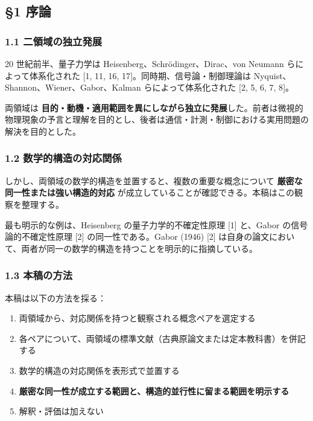 \documentclass[
]{ltjsarticle}
\providecommand{\tightlist}{%
  \setlength{\itemsep}{0pt}\setlength{\parskip}{0pt}}
\begin{document}
\subsection{§1 序論}\label{ux5e8fux8ad6}

\subsubsection{1.1
二領域の独立発展}\label{ux4e8cux9818ux57dfux306eux72ecux7acbux767aux5c55}

20 世紀前半、量子力学は Heisenberg、Schrödinger、Dirac、von Neumann
らによって体系化された {[}1, 11, 16, 17{]}。同時期、信号論・制御理論は
Nyquist、Shannon、Wiener、Gabor、Kalman らによって体系化された {[}2, 5,
6, 7, 8{]}。

両領域は
\textbf{目的・動機・適用範囲を異にしながら独立に発展}した。前者は微視的物理現象の予言と理解を目的とし、後者は通信・計測・制御における実用問題の解決を目的とした。

\subsubsection{1.2
数学的構造の対応関係}\label{ux6570ux5b66ux7684ux69cbux9020ux306eux5bfeux5fdcux95a2ux4fc2}

しかし、両領域の数学的構造を並置すると、複数の重要な概念について
\textbf{厳密な同一性または強い構造的対応}
が成立していることが確認できる。本稿はこの観察を整理する。

最も明示的な例は、Heisenberg の量子力学的不確定性原理 {[}1{]} と、Gabor
の信号論的不確定性原理 {[}2{]} の同一性である。Gabor (1946) {[}2{]}
は自身の論文において、両者が同一の数学的構造を持つことを明示的に指摘している。

\subsubsection{1.3 本稿の方法}\label{ux672cux7a3fux306eux65b9ux6cd5}

本稿は以下の方法を採る：

\begin{enumerate}
\def\labelenumi{\arabic{enumi}.}
\tightlist
\item
  両領域から、対応関係を持つと観察される概念ペアを選定する
\item
  各ペアについて、両領域の標準文献（古典原論文または定本教科書）を併記する
\item
  数学的構造の対応関係を表形式で並置する
\item
  \textbf{厳密な同一性が成立する範囲と、構造的並行性に留まる範囲を明示する}
\item
  解釈・評価は加えない
\end{enumerate}
\end{document}
